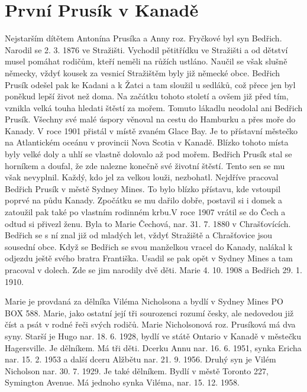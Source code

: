 \documentclass[../dejiny-rodu-prusiku.tex]{subfiles}
\begin{document}
\section{První Prusík v Kanadě}
Nejstarším dítětem Antonína Prusíka a Anny roz. Fryčkové byl syn Bedřich. Narodil se 2. 3. 1876 ve Stražišti. Vychodil pětitřídku ve Stražišti a od dětství musel pomáhat rodičům, kteří neměli na růžích ustláno. Naučil se však slušně německy, vždyť kousek za vesnicí Stražištěm byly již německé obce. Bedřich Prusík odešel pak ke Ka­dani a k Žatci a tam sloužil u sedláků, což přece jen byl poněkud lepší život než doma. Na začátku tohoto století a ovšem již před tím, vznikla velká touha hledati štěstí za mořem. Tomuto lákadlu neodolal ani Bedřich Prusík. Všechny své malé úspory věnoval na cestu do Ham­burku a přes moře do Kanady. V roce 1901 přistál v místě zvaném Glace Bay. Je to přístavní městečko na Atlantickém oceánu v provincii Nova Scotia v Kanadě. Blízko tohoto místa byly velké doly a uhlí se vlastně dolovalo až pod mořem. Bedřich Prusík stal se horníkem a doufal, že zde nalezne konečně své životní štěstí. Tento sen se mu však nevyplnil. Každý, kdo jel za velkou louži, nezbohatl. Nejdříve pracoval Bedřich Prusík v městě Sydney Mines. To bylo blízko přístavu, kde vstoupil poprvé na půdu Kanady. Zpočátku se mu dařilo dobře, postavil si i domek a zatoužil pak také po vlastním rodinném krbu.V roce 1907 vrátil se do Čech a odtud si přivezl ženu. Byla to Marie Čechová, nar. 31. 7. 1880 v Chrašťovících. Bedřich se s ní
znal již od mladých let, vždyť Stražiště a Chrašťovice jsou sousední obce. Když se Bedřich se svou manželkou vracel do Kanady, nalákal k odjezdu ještě svého bratra Františka. Usadil se pak opět v Sydney Mines a tam pracoval v dolech. Zde se jim narodily dvě děti. Marie 4. 10. 1908 a Bedřich 29. 1. 1910.


Marie je provdaná za dělníka Viléma Nicholsona a bydlí v Sydney Mines PO BOX 588. Marie, jako ostatní její tři sourozenci rozumí česky, ale nedovedou již číst a psát v rodné řeči svých rodičů. Marie Nicholsonová roz. Prusíková má dva syny. Starší je Hugo nar. 18. 6. 1928, bydlí ve státě Ontario v Kanadě v městečku Hagersville. Je dělníkem. Má tři děti. Dcerku Annu nar. 16. 6. 1951, synka Ericha nar. 15. 2. 1953 a další dceru Alžbětu nar. 21. 9. 1956. Druhý syn je Vilém Nicholson nar. 30. 7. 1929. Je také dělníkem. Bydlí v městě Toronto 227, Symington Avenue. Má jednoho synka Viléma, nar. 15. 12. 1958.
\end{document}
